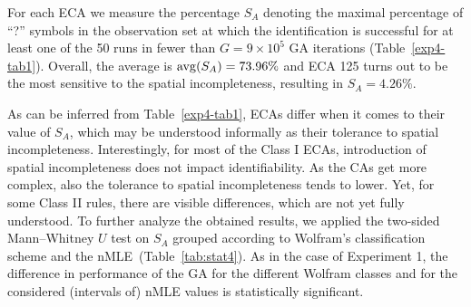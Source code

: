 For each ECA we measure the percentage $S_A$ denoting the maximal percentage of ``?'' symbols in the observation set at which the identification is successful for at least one of the 50 runs in fewer than $G = 9\times 10^5$ GA iterations (Table~\ref{exp4-tab1}). Overall, the average is $\operatorname{avg}(S_A) = 73.96\%$ and ECA 125 turns out to be the most sensitive to the spatial incompleteness, resulting in $S_A=4.26\%$.
\begin{table}[ht]
	\centering
	\caption{Experiment 4: Minimal, average and maximal percentage $S_A$ denoting the maximal density of ``?'' symbols in the observation set at which the identification is successful for at least one of the 50 runs, per behavioral class according to Wolfram's classification scheme \protect{} and the nMLE~\protect{}.}\label{exp4-tab1}
	\quad
\end{table}

As can be inferred from Table~\ref{exp4-tab1}, ECAs differ when it comes to their value of $S_A$, which may be understood informally as their tolerance to spatial incompleteness. Interestingly, for most of the Class I ECAs, introduction of spatial incompleteness does not impact identifiability. As the CAs get more complex, also the tolerance to spatial incompleteness tends to lower. Yet, for some Class II rules, there are visible differences, which are not yet fully understood. To further analyze the obtained results, we applied the two-sided Mann--Whitney $U$ test on $S_A$ grouped according to Wolfram's classification scheme and the
nMLE~(Table~\ref{tab:stat4}). As in the case of Experiment 1, the difference in performance of the GA for the different Wolfram classes and for the considered (intervals of) nMLE values is statistically significant.

